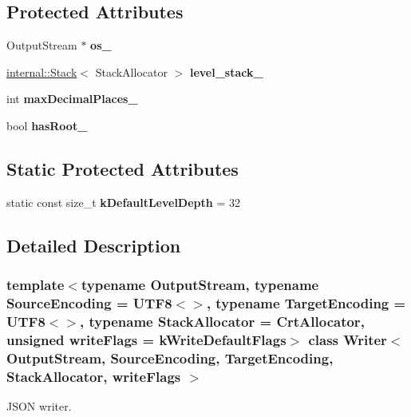 \subsection*{Protected Attributes}
\begin{DoxyCompactItemize}
\item 
\mbox{\label{a02224_a3a3f60140f78dd67b5274978fd3a33ff}} 
Output\+Stream $\ast$ {\bfseries os\+\_\+}
\item 
\mbox{\label{a02224_a9e6c13c06fc721dfd8486f17b9ff29de}} 
\hyperlink{a02288}{internal\+::\+Stack}$<$ Stack\+Allocator $>$ {\bfseries level\+\_\+stack\+\_\+}
\item 
\mbox{\label{a02224_a3d4ef664c3cdf34a286b13d27adcdd4d}} 
int {\bfseries max\+Decimal\+Places\+\_\+}
\item 
\mbox{\label{a02224_affc6b9e0332b50bee0d33f8b1841c9a6}} 
bool {\bfseries has\+Root\+\_\+}
\end{DoxyCompactItemize}
\subsection*{Static Protected Attributes}
\begin{DoxyCompactItemize}
\item 
\mbox{\label{a02224_a9cb4caeb9d8971f305edff1d70e67acb}} 
static const size\+\_\+t {\bfseries k\+Default\+Level\+Depth} = 32
\end{DoxyCompactItemize}


\subsection{Detailed Description}
\subsubsection*{template$<$typename Output\+Stream, typename Source\+Encoding = U\+T\+F8$<$$>$, typename Target\+Encoding = U\+T\+F8$<$$>$, typename Stack\+Allocator = Crt\+Allocator, unsigned write\+Flags = k\+Write\+Default\+Flags$>$\newline
class Writer$<$ Output\+Stream, Source\+Encoding, Target\+Encoding, Stack\+Allocator, write\+Flags $>$}

J\+S\+ON writer. 

